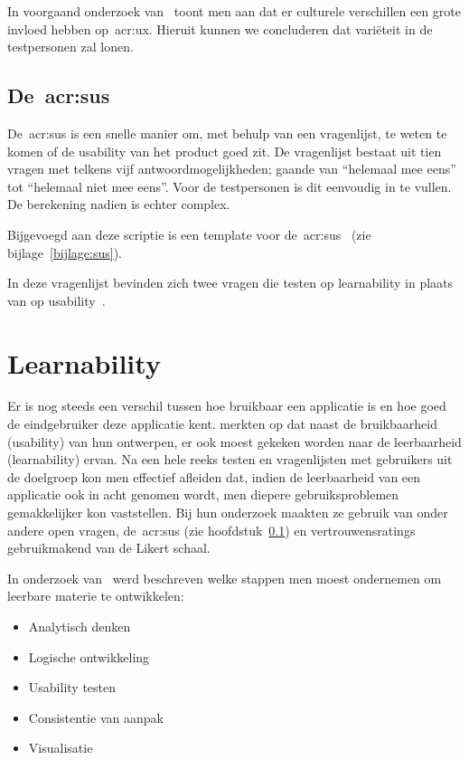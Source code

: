 In voorgaand onderzoek van~\textcite{Marcus2006} toont men aan dat er culturele verschillen een grote invloed hebben op~\acrshort{acr:ux}. Hieruit kunnen we concluderen dat variëteit in de testpersonen zal lonen.

\subsection{De~\acrlong{acr:sus}}
\label{sec:usability-testing:sus}

De~\acrlong{acr:sus} is een snelle manier om, met behulp van een vragenlijst, te weten te komen of de usability van het product goed zit. De vragenlijst bestaat uit tien vragen met telkens vijf antwoordmogelijkheden; gaande van ``helemaal mee eens'' tot ``helemaal niet mee eens''. Voor de testpersonen is dit eenvoudig in te vullen. De berekening nadien is echter complex.

Bijgevoegd aan deze scriptie is een template voor de~\acrlong{acr:sus}~\autocite{Calisto2018} (zie bijlage~\ref{bijlage:sus}).

In deze vragenlijst bevinden zich twee vragen die testen op learnability in plaats van op usability~\autocite{Lewis2009}.

\section{Learnability}
\label{sec:learnability}

Er is nog steeds een verschil tussen hoe bruikbaar een applicatie is en hoe goed de eindgebruiker deze applicatie kent. \textcite{Coyle2016} merkten op dat naast de bruikbaarheid (usability) van hun ontwerpen, er ook moest gekeken worden naar de leerbaarheid (learnability) ervan. Na een hele reeks testen en vragenlijsten met gebruikers uit de doelgroep kon men effectief afleiden dat, indien de leerbaarheid van een applicatie ook in acht genomen wordt, men diepere gebruiksproblemen gemakkelijker kon vaststellen. Bij hun onderzoek maakten ze gebruik van onder andere open vragen, de~\acrlong{acr:sus} (zie hoofdstuk~\ref{sec:usability-testing:sus}) en vertrouwensratings gebruikmakend van de Likert schaal.

In onderzoek van~\textcite{Haramundanis2001} werd beschreven welke stappen men moest ondernemen om leerbare materie te ontwikkelen:
\begin{itemize}
    \item Analytisch denken
    \item Logische ontwikkeling
    \item Usability testen
    \item Consistentie van aanpak
    \item Visualisatie
\end{itemize}

